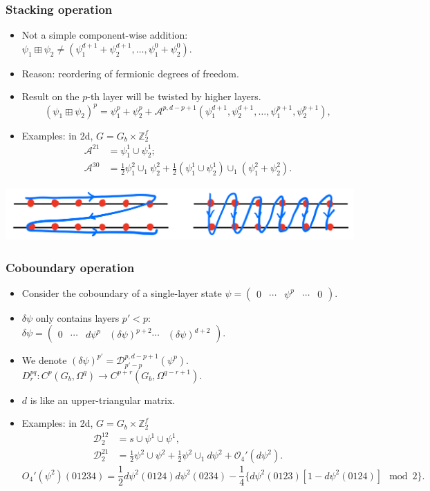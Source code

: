 \documentclass[xcolor=table, aspectratio=169]{beamer}
\begin{document}
\begin{frame}
	\frametitle{Stacking operation}
	\begin{itemize}
		\item Not a simple component-wise addition:
		$\psi_1\boxplus\psi_2\neq (\psi_1^{d+1}+\psi_2^{d+1},\ldots,\psi_1^0+\psi_2^0)$.
		\item Reason: reordering of fermionic degrees of freedom.
		\item Result on the $p$-th layer will be twisted by higher layers.
		\[(\psi_1\boxplus\psi_2)^p = \psi_1^p + \psi_2^p
    + \mathcal A^{p,d-p+1}(\psi_1^{d+1},\psi_2^{d+1},\ldots,\psi_1^{p+1}, \psi_2^{p+1}),\]
		\item Examples: in 2d, $G=G_b\times\mathbb Z_2^f$
		\begin{align*}
		  \mathcal A^{21} &= \psi^1_1\cup\psi^1_2;\\
		  \mathcal A^{30} &= \frac12\psi^2_1\cup_1\psi^2_2 + \frac12 (\psi^1_1\cup\psi^1_2)\cup_1(\psi^2_1+\psi^2_2).
		\end{align*}
	\end{itemize}
	\begin{center}
		\includegraphics[height=2cm]{forder}
	\end{center}
\end{frame}

\begin{frame}
	\frametitle{Coboundary operation}
	\begin{itemize}
		\item Consider the coboundary of a single-layer state
		$\psi = \begin{pmatrix}0&\cdots&\psi^p&\cdots&0\end{pmatrix}$.
		\item $\delta\psi$ only contains layers $p'<p$:
		$\delta\psi=\begin{pmatrix}0&\cdots&d\psi^p&(\delta\psi)^{p+2}\cdots&(\delta\psi)^{d+2}\end{pmatrix}$.
		\item We denote $(\delta\psi)^{p'}=\mathcal D^{p, d-p+1}_{p'-p}(\psi^p)$.
		$D^{pq}_r:C^p(G_b,\Omega^q)\rightarrow C^{p+r}(G_b,\Omega^{q-r+1})$.
		\item $d$ is like an upper-triangular matrix.
		\item Examples: in 2d, $G=G_b\times\mathbb Z_2^f$
		\begin{align*}
			\mathcal D_2^{12} &= s\cup\psi^1\cup\psi^1,\\
		  \mathcal D_2^{21} &= \frac12\psi^2\cup\psi^2
		  +\frac12\psi^2\cup_1d\psi^2
		  +\mathcal O_4'(d\psi^2).
		\end{align*}
		\[  O_4'(\psi^2)(01234)
		  =\frac12d\psi^2(0124)d\psi^2(0234)
		  -\frac14\{d\psi^2(0123)[1-d\psi^2(0124)] \mod 2\}.\]
	\end{itemize}
\end{frame}
\end{document}

